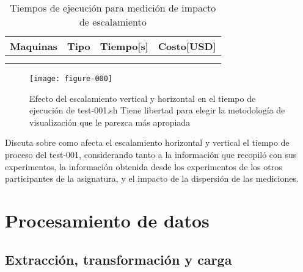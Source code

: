 \documentclass[12pt,letterpaper,twoside]{article}
\begin{document}
    \begin{table}
        \centering
        \begin{tabular}{|c|c|c|c|}
            \hline
            Maquinas & Tipo & Tiempo[s] & Costo[USD] \\
            \hline
            \hline
                     &      &           &            \\
            \hline
                     &      &           &            \\
            \hline
        \end{tabular}
        \caption{Tiempos de ejecución para medición de impacto de escalamiento}
        \label{table:002}
    \end{table}

\begin{figure}[H]
    \centering
    \texttt{[image: figure-000]}
    \caption{Efecto del escalamiento vertical y horizontal en el tiempo de ejecución de test-001.sh
    {\color{red} Tiene libertad para elegir la metodología de visualización que le parezca más apropiada}}
    \label{fig:001}
\end{figure}

{\color{red} Discuta sobre como afecta el escalamiento horizontal y vertical el tiempo de proceso del test-001, considerando tanto a la información que recopiló con sus experimentos, la información obtenida desde los experimentos de los otros participantes de la asignatura, y el impacto de la dispersión de las mediciones.}

\section{Procesamiento de datos}

\subsection{Extracción, transformación y carga}
\end{document}
